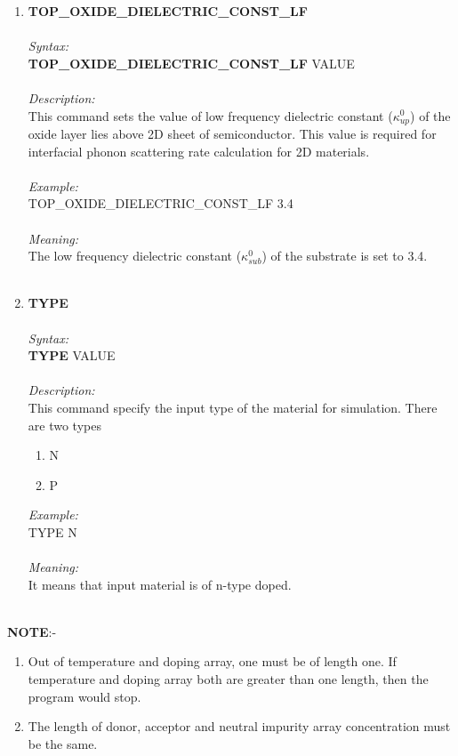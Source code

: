 \documentclass[12pt]{article}
\begin{document}
\begin{enumerate}
    \item \textbf{TOP\_OXIDE\_DIELECTRIC\_CONST\_LF}   \\ \\
    \textit{Syntax:} \\
    \textbf{TOP\_OXIDE\_DIELECTRIC\_CONST\_LF} VALUE  \\ \\
    \textit{Description:} \\
    This command sets the value of low frequency dielectric constant ($\kappa_{up}^0$) of the oxide layer lies above 2D sheet of semiconductor. This value is required for interfacial phonon scattering rate calculation for 2D materials. \\ \\
    \textit{Example:} \\
    TOP\_OXIDE\_DIELECTRIC\_CONST\_LF 3.4 \\ \\
    \textit{Meaning:} \\    
    The low frequency dielectric constant ($\kappa_{sub}^{0}$) of the substrate is set to 3.4. \\ \\

 
    \item \textbf{TYPE} \\ \\
    \textit{Syntax:} \\
    \textbf{TYPE} VALUE \\ \\
    \textit{Description:} \\
    This command specify the input type of the material for simulation. There are two types 
    \begin{enumerate}
        \item N
        \item P
    \end{enumerate}
    \textit{Example:} \\
    TYPE N \\ \\
    \textit{Meaning:} \\    
    It means that input material is of n-type doped. \\ \\

\end{enumerate}

    \textbf{NOTE}:-
    \begin{enumerate}

    \item Out of temperature and doping array, one must be of length one. If temperature and doping array both are greater than one length, then the program would stop. 
    \item The length of donor, acceptor and neutral impurity array concentration must be the same. 
    \end{enumerate}
    
\end{document}
